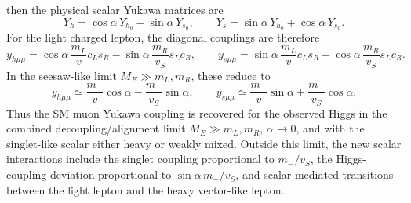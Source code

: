 \documentclass[onecolumn, aps, nofootinbib, prd, preprint, floats, floatfix, amsmath, amssymb, superscriptaddress, preprintnumbers]{revtex4-1}
\begin{document}
then the physical scalar Yukawa matrices are
\begin{equation}
Y_h=\cos\alpha\,Y_{h_0}-\sin\alpha\,Y_{s_0},
\qquad
Y_s=\sin\alpha\,Y_{h_0}+\cos\alpha\,Y_{s_0}.
\label{eq:physical-scalar-yukawa}
\end{equation}
For the light charged lepton, the diagonal couplings are therefore
\begin{equation}
y_{h\mu\mu}=
\cos\alpha\,\frac{m_L}{v}c_Ls_R
-\sin\alpha\,\frac{m_R}{v_S}s_Lc_R,
\qquad
y_{s\mu\mu}=
\sin\alpha\,\frac{m_L}{v}c_Ls_R
+\cos\alpha\,\frac{m_R}{v_S}s_Lc_R .
\label{eq:light-scalar-yukawa}
\end{equation}
In the seesaw-like limit $M_E\gg m_L,m_R$, these reduce to
\begin{equation}
y_{h\mu\mu}\simeq
\frac{m_-}{v}\cos\alpha-\frac{m_-}{v_S}\sin\alpha,
\qquad
y_{s\mu\mu}\simeq
\frac{m_-}{v}\sin\alpha+\frac{m_-}{v_S}\cos\alpha .
\label{eq:sm-limit-scalar-yukawa}
\end{equation}
Thus the SM muon Yukawa coupling is recovered for the observed Higgs in the combined decoupling/alignment limit $M_E\gg m_L,m_R$, $\alpha\to0$, and with the singlet-like scalar either heavy or weakly mixed. Outside this limit, the new scalar interactions include the singlet coupling proportional to $m_-/v_S$, the Higgs-coupling deviation proportional to $\sin\alpha\,m_-/v_S$, and scalar-mediated transitions between the light lepton and the heavy vector-like lepton.
\end{document}
